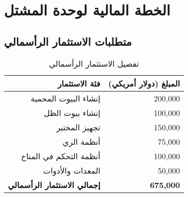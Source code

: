 \section{الخطة المالية لوحدة المشتل}

\subsection{متطلبات الاستثمار الرأسمالي}

\begin{table}[h]
\centering
\begin{tabular}{|r|r|}
\hline
\textbf{فئة الاستثمار} & \textbf{المبلغ (دولار أمريكي)} \\
\hline
إنشاء البيوت المحمية & 200,000 \\
إنشاء بيوت الظل & 100,000 \\
تجهيز المختبر & 150,000 \\
أنظمة الري & 75,000 \\
أنظمة التحكم في المناخ & 100,000 \\
المعدات والأدوات & 50,000 \\
\hline
\textbf{إجمالي الاستثمار الرأسمالي} & \textbf{675,000} \\
\hline
\end{tabular}
\caption{تفصيل الاستثمار الرأسمالي}
\end{table}


